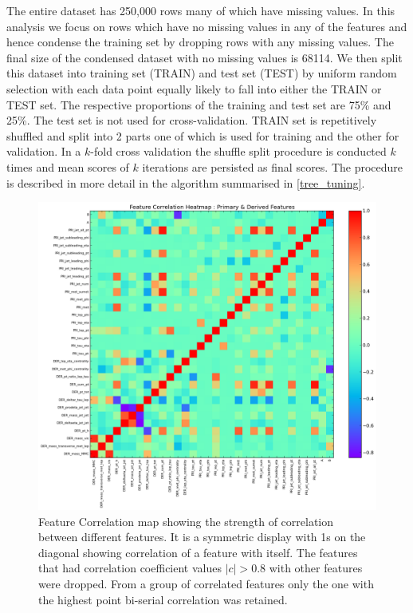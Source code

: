 \documentclass[final,3p,times,twocolumn]{elsarticle}
\begin{document}
The entire dataset has 250,000 rows many of which have missing values. In this analysis we focus on rows which have no missing values in any of the features and hence condense the training set by dropping rows with any missing values. The final size of the condensed dataset with no missing values is 68114. We then split this dataset into training set (TRAIN) and test set (TEST) by uniform random selection with each data point equally likely to fall into either the TRAIN or TEST set. The respective proportions of the training and test set are 75\% and 25\%. The test set is not used for cross-validation. TRAIN set is repetitively shuffled and split into 2 parts one of which is used for training and the other for validation. In a $k$-fold cross validation the shuffle split procedure is conducted $k$ times and mean scores of $k$ iterations are persisted as final scores. The procedure is described in more detail in the algorithm summarised in \ref{tree_tuning}.

\begin{figure}
\hspace{-2cm}
\includegraphics[scale=0.6]{Images/DERFeaturesHeatMap.png}
\caption{Feature Correlation map showing the strength of correlation between different features. It is a symmetric display with 1s on the diagonal showing correlation of a feature with itself. The features that had correlation coefficient values $|c| > 0.8$ with other features were dropped. From a group of correlated features only the one with the highest point bi-serial correlation was retained.}
\label{ff}
\end{figure}
\end{document}
